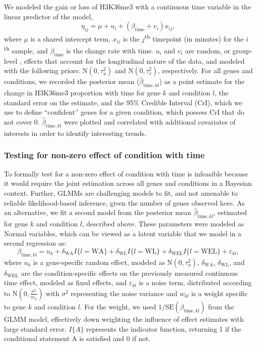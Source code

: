 \documentclass[12pt]{extarticle}
\begin{document}
We modeled the gain or loss of H3K36me3 with a continuous time variable in the linear predictor of the model, 
\begin{equation}
	\eta_{ij} = \mu + u_{i} + (\beta_{\text{time}} + v_{i})x_{ij},
\end{equation}
where $\mu$ is a shared intercept term, $x_{ij}$ is the $j$\textsuperscript{th} timepoint (in minutes) for the $i$\textsuperscript{th} sample, and $\beta_{\text{time}}$ is the change rate with time. $u_{i}$ and $v_{i}$ are random, or group-level \cite{Gelman2006}, effects that account for the longitudinal nature of the data, and modeled with the following priors: $\text{N}(0, \tau^{2}_{u})$ and $\text{N}(0, \tau^{2}_{v})$, respectively. For all genes and conditions, we recorded the posterior mean ($\widehat{\beta}_{\text{time}, kl}$) as a point estimate for the change in H3K36me3 proportion with time for gene $k$ and condition $l$, the standard error on the estimate, and the 95\% Credible Interval (CrI), which we use to define ``confident'' genes for a given condition, which possess CrI that do not cover 0. $\widehat{\beta}_{\text{time}, kl}$ were plotted and correlated with additional covariates of interests in order to identify interesting trends.

\subsubsection*{Testing for non-zero effect of condition with time}

To formally test for a non-zero effect of condition with time is infeasible because it would require the joint estimation across all genes and conditions in a Bayesian context. Further, GLMMs are challenging models to fit, and not amenable to reliable likelihood-based inference, given the number of genes observed here. As an alternative, we fit a second model from the posterior mean $\widehat{\beta}_{\text{time}, kl}$, estimated for gene $k$ and condition $l$, described above. These parameters were modeled as Normal variables, which can be viewed as a latent variable that we model in a second regression as:
\begin{equation}
	\beta_{\text{time}, kl} = u_{k} + \delta_{\text{WA}}I\{l = \text{WA}\} + \delta_{\text{WL}}I\{l = \text{WL}\} + \delta_{\text{WEL}}I\{l = \text{WEL}\} + \varepsilon_{kl},
	\label{eq:alt_model}
\end{equation}
where $u_{k}$ is a gene-specific random effect, modeled as $\text{N}(0, \tau^{2}_{u})$, $\delta_{\text{WA}}$, $\delta_{\text{WL}}$, and $\delta_{\text{WEL}}$ are the condition-specific effects on the previously measured continuous time effect, modeled as fixed effects, and $\varepsilon_{kl}$ is a noise term, distributed according to $\text{N}(0, \frac{\sigma^{2}}{w_{ij}})$ with $\sigma^{2}$ representing the noise variance and $w_{kl}$ is a weight specific to gene $k$ and condition $l$. For the weight, we used $1/\text{SE}(\beta_{\text{time}, kl})$ from the GLMM model, effectively down weighting the influence of effect estimates with large standard error. $I\{A\}$ represents the indicator function, returning 1 if the conditional statement A is satisfied and 0 if not. 
\end{document}
